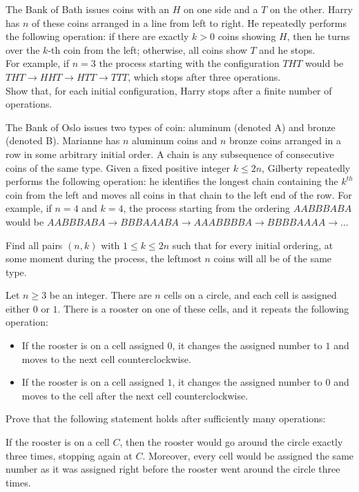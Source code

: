 \begin{problem}[IMO 2019]
   The Bank of Bath issues coins with an $H$ on one side and a $T$ on the other. Harry has $n$ of these coins arranged in a line from left to right. He repeatedly performs the following operation: if there are exactly $k>0$ coins showing $H$, then he turns over the $k$-th coin from the left; otherwise, all coins show $T$ and he stops. \\ For example, if $n=3$ the process starting with the configuration $THT$ would be $THT \to HHT \to HTT \to TTT$, which stops after three operations. \\ Show that, for each initial configuration, Harry stops after a finite number of operations.
\end{problem}

\begin{problem}[IMO 2022]
    The Bank of Oslo issues two types of coin: aluminum (denoted A) and bronze (denoted B). Marianne has $n$ aluminum coins and $n$ bronze coins arranged in a row in some arbitrary initial order. A chain is any subsequence of consecutive coins of the same type. Given a fixed positive integer $k \leq 2n$, Gilberty repeatedly performs the following operation: he identifies the longest chain containing the $k^{th}$ coin from the left and moves all coins in that chain to the left end of the row. For example, if $n=4$ and $k=4$, the process starting from the ordering $AABBBABA$ would be $AABBBABA \to BBBAAABA \to AAABBBBA \to BBBBAAAA \to \dots$

    Find all pairs $(n,k)$ with $1 \leq k \leq 2n$ such that for every initial ordering, at some moment during the process, the leftmost $n$ coins will all be of the same type.
\end{problem}

\begin{problem}[APMO 2025]
    Let $n \geq 3$ be an integer. There are $n$ cells on a circle, and each cell is assigned either $0$ or $1$. There is a rooster on one of these cells, and it repeats the following operation:
    \begin{itemize}
        \item If the rooster is on a cell assigned $0$, it changes the assigned number to $1$ and moves to the next cell counterclockwise.
        \item If the rooster is on a cell assigned $1$, it changes the assigned number to $0$ and moves to the cell after the next cell counterclockwise.
    \end{itemize}
    Prove that the following statement holds after sufficiently many operations:

    If the rooster is on a cell $C$, then the rooster would go around the circle exactly three times, stopping again at $C$. Moreover, every cell would be assigned the same number as it was assigned right before the rooster went around the circle three times.
\end{problem}

